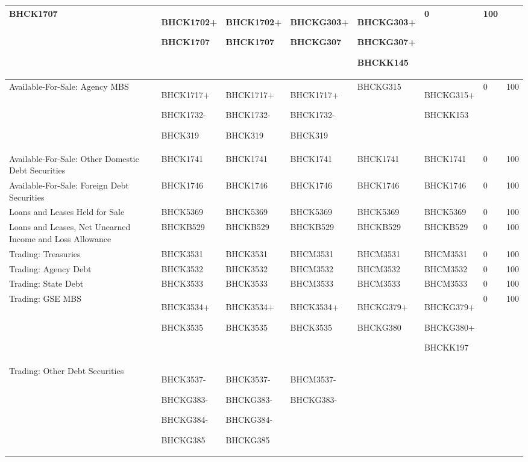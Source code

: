 \begin{landscape}
\begin{longtable}{|>{\raggedright}p{3cm}|>{\raggedright}p{2.2cm}|>{\raggedright}p{2.2cm}|>{\raggedright}p{2.2cm}|>{\raggedright}p{2.5cm}|>{\raggedright}p{2.5cm}|>{\raggedright}p{1cm}|>{\raggedright}p{1cm}|}
BHCK1707  & BHCK1702+

BHCK1707  & BHCK1702+

BHCK1707  & BHCKG303+

BHCKG307  & BHCKG303+

BHCKG307+

BHCKK145  & 0  & 100\tabularnewline
\hline 
Available-For-Sale: Agency MBS  & BHCK1717+

BHCK1732-

BHCK319  & BHCK1717+

BHCK1732-

BHCK319  & BHCK1717+

BHCK1732-

BHCK319  & BHCKG315  & BHCKG315+

BHCKK153  & 0  & 100\tabularnewline
\hline 
Available-For-Sale: Other Domestic Debt Securities  & BHCK1741  & BHCK1741  & BHCK1741  & BHCK1741  & BHCK1741  & 0  & 100\tabularnewline
\hline 
Available-For-Sale: Foreign Debt Securities  & BHCK1746  & BHCK1746  & BHCK1746  & BHCK1746  & BHCK1746  & 0  & 100\tabularnewline
\hline 
Loans and Leases Held for Sale  & BHCK5369  & BHCK5369  & BHCK5369  & BHCK5369  & BHCK5369  & 0  & 100\tabularnewline
\hline 
Loans and Leases, Net Unearned Income and Loss Allowance  & BHCKB529  & BHCKB529  & BHCKB529  & BHCKB529  & BHCKB529  & 0  & 100\tabularnewline
\hline 
Trading: Treasuries  & BHCK3531  & BHCK3531  & BHCM3531  & BHCM3531  & BHCM3531  & 0  & 100\tabularnewline
\hline 
Trading: Agency Debt  & BHCK3532  & BHCK3532  & BHCM3532  & BHCM3532  & BHCM3532  & 0  & 100\tabularnewline
\hline 
Trading: State Debt  & BHCK3533  & BHCK3533  & BHCM3533  & BHCM3533  & BHCM3533  & 0  & 100\tabularnewline
\hline 
Trading: GSE MBS  & BHCK3534+

BHCK3535  & BHCK3534+

BHCK3535  & BHCK3534+

BHCK3535  & BHCKG379+

BHCKG380  & BHCKG379+

BHCKG380+

BHCKK197  & 0  & 100\tabularnewline
\hline 
Trading: Other Debt Securities  & BHCK3537-

BHCKG383-

BHCKG384-

BHCKG385  & BHCK3537-

BHCKG383-

BHCKG384-

BHCKG385  & BHCM3537-

BHCKG383-


\end{longtable}
\end{landscape}
